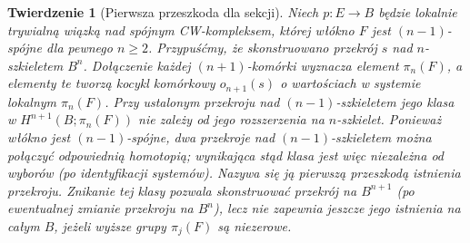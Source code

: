 \documentclass[11pt,a4paper,oneside]{report}
\theoremstyle{plain}
\newtheorem{twierdzenie}{Twierdzenie}[section]
\theoremstyle{definition}
\theoremstyle{remark}
\begin{document}
\begin{center}
\end{center}

\begin{twierdzenie}[Pierwsza przeszkoda dla sekcji]
\label{thm:obstruction-section-v6}
Niech $p:E\to B$ będzie lokalnie trywialną wiązką nad
spójnym CW-kompleksem, której włókno $F$ jest
$(n-1)$-spójne dla pewnego $n\ge2$.
Przypuśćmy, że skonstruowano przekrój $s$ nad
$n$-szkieletem $B^n$. Dołączenie każdej $(n+1)$-komórki
wyznacza element $\pi_n(F)$, a elementy te tworzą
kocykl komórkowy $o_{n+1}(s)$ o wartościach
w systemie lokalnym $\mathcal\pi_n(F)$.
Przy ustalonym przekroju nad $(n-1)$-szkieletem
jego klasa w $H^{n+1}(B;\mathcal\pi_n(F))$ nie zależy
od jego rozszerzenia na $n$-szkielet. Ponieważ
włókno jest $(n-1)$-spójne, dwa przekroje nad
$(n-1)$-szkieletem można połączyć odpowiednią
homotopią; wynikająca stąd klasa jest więc
niezależna od wyborów (po identyfikacji systemów).
Nazywa się ją \emph{pierwszą przeszkodą} istnienia przekroju. Znikanie tej klasy pozwala
skonstruować przekrój na $B^{n+1}$ (po ewentualnej
zmianie przekroju na $B^n$), lecz nie zapewnia
jeszcze jego istnienia na całym $B$, jeżeli
wyższe grupy $\pi_j(F)$ są niezerowe.
\end{twierdzenie}
\end{document}
